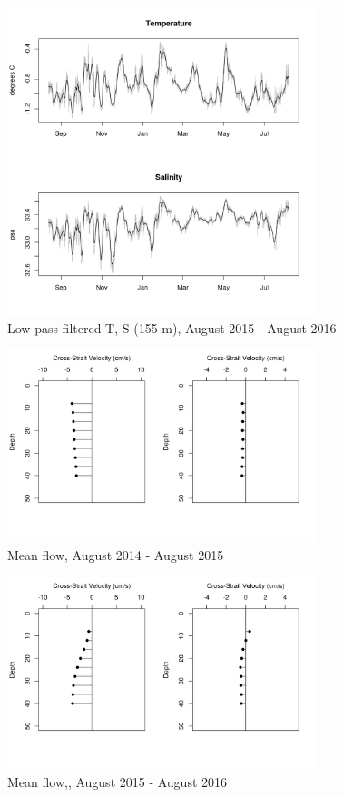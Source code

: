 \documentclass[12pt]{dforeport}
\begin{document}
\begin{figure}  
\centering
\includegraphics[width = 0.8\textwidth]{./figures/35_lpf_TS_155m_2015_2016.png}
\caption[Low-pass filtered T, S (155 m), 2015-2016]{Low-pass filtered T, S (155 m), August 2015 - August 2016}
\label{f:ctd_155_lpf_2015_2016}
\end{figure}

\pagebreak
\newpage

\begin{figure}  
\centering
\includegraphics[width = 0.8\textwidth]{./figures/36_amf_2014_2015.png}
\caption[Mean flow, 2014-2015]{Mean flow, August 2014 - August 2015}
\label{f:amf_2014_2015}
\end{figure}

\begin{figure}  
\centering
\includegraphics[width = 0.8\textwidth]{./figures/37_amf_2015_2016.png}
\caption[Mean flow, 2015-2016]{Mean flow,, August 2015 - August 2016}
\label{f:amf_2015_2016}
\end{figure}
\end{document}

